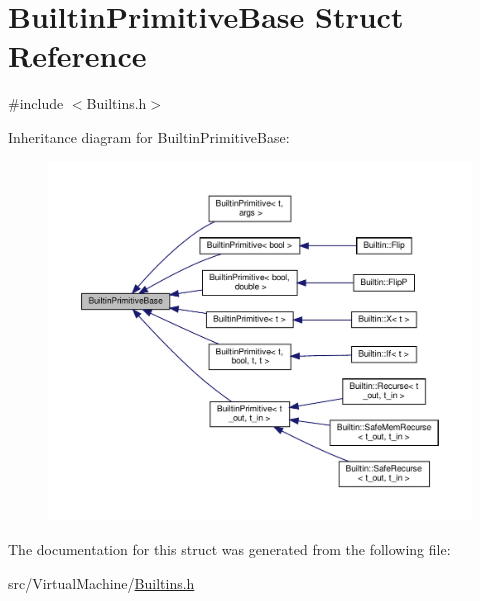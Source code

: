 \hypertarget{struct_builtin_primitive_base}{}\section{Builtin\+Primitive\+Base Struct Reference}
\label{struct_builtin_primitive_base}


{\ttfamily \#include $<$Builtins.\+h$>$}



Inheritance diagram for Builtin\+Primitive\+Base\+:\nopagebreak
\begin{figure}[H]
\begin{center}
\leavevmode
\includegraphics[width=350pt]{struct_builtin_primitive_base__inherit__graph}
\end{center}
\end{figure}


The documentation for this struct was generated from the following file\+:\begin{DoxyCompactItemize}
\item 
src/\+Virtual\+Machine/\hyperlink{_builtins_8h}{Builtins.\+h}\end{DoxyCompactItemize}
